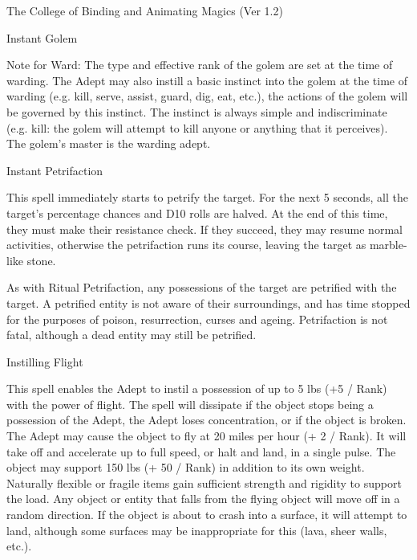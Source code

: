 \begin{Chapter}{The College of Binding and Animating Magics (Ver 1.2)}
\begin{spell}[S-4]{Instant Golem}
\begin{effects}
Note for Ward: The type and effective rank of the golem are set at the
time of warding.  The Adept may also instill a basic instinct into the
golem at the time of warding (e.g.  kill, serve, assist, guard, dig,
eat, etc.), the actions of the golem will be governed by this
instinct.  The instinct is always simple and indiscriminate
(e.g. kill: the golem will attempt to kill anyone or anything that it
perceives). The golem’s master is the warding adept.
\end{effects}
\end{spell}

\begin{spell}[S-5]{Instant Petrifaction}
\begin{effects}
This spell immediately starts to petrify the target.  For the next 5
seconds, all the target’s percentage chances and D10 rolls are halved.
At the end of this time, they must make their resistance check.  If
they succeed, they may resume normal activities, otherwise the
petrifaction runs its course, leaving the target as marble-like stone.

As with Ritual Petrifaction, any possessions of the target are
petrified with the target.  A petrified entity is not aware of their
surroundings, and has time stopped for the purposes of poison,
resurrection, curses and ageing.  Petrifaction is not fatal,
although a dead entity may still be petrified.
\end{effects}
\end{spell}

\begin{spell}[S-6]{Instilling Flight }

\begin{effects}
This spell enables the Adept to instil a possession of up to 5 lbs (+5
/ Rank) with the power of flight.  The spell will dissipate if the
object stops being a possession of the Adept, the Adept loses
concentration, or if the object is broken.  The Adept may cause the
object to fly at 20 miles per hour (+ 2 / Rank).  It will take off and
accelerate up to full speed, or halt and land, in a single pulse. The
object may support 150 lbs (+ 50 / Rank) in addition to its own
weight.  Naturally flexible or fragile items gain sufficient strength
and rigidity to support the load.  Any object or entity that falls
from the flying object will move off in a random direction.  If the
object is about to crash into a surface, it will attempt to land,
although some surfaces may be inappropriate for this (lava, sheer
walls, etc.).
\end{effects}
\end{spell}


\end{Chapter}
